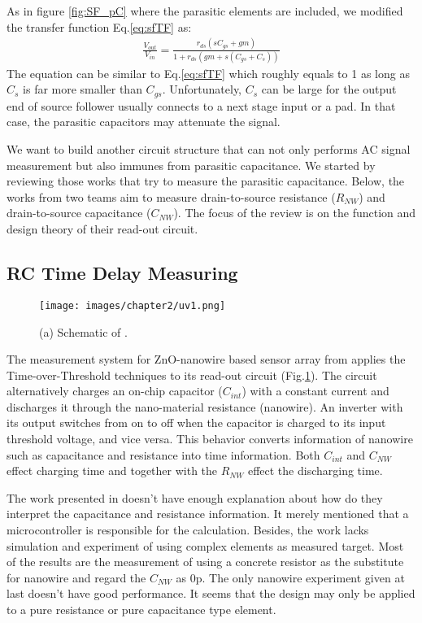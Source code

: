 As in figure \ref{fig:SF_pC} where the parasitic elements are included, we modified the transfer function Eq.\ref{eq:sfTF} as:
\begin{align}
    \frac{V_{out}}{V_{in}} = \frac{r_{ds}(sC_{gs} + gm)}{1 + r_{ds}(gm + s(C_{gs}+C_s))}
\end{align}
The equation can be similar to Eq.\ref{eq:sfTF} which roughly equals to 1 as long as $C_s$ is far more smaller than $C_{gs}$.
Unfortunately, $C_s$ can be large for the output end of source follower usually connects to a next stage input or a pad.
In that case, the parasitic capacitors may attenuate the signal.

We want to build another circuit structure that can not only performs AC signal measurement but also immunes from parasitic capacitance.
We started by reviewing those works that try to measure the parasitic capacitance.
Below, the works from two teams aim to measure drain-to-source resistance ($R_{NW}$) and drain-to-source capacitance ($C_{NW}$).
The focus of the review is on the function and design theory of their read-out circuit.


\subsection{RC Time Delay Measuring}
\begin{figure}[!htbp]
    \centering
    \texttt{[image: images/chapter2/uv1.png]}
    \caption{(a) Schematic of \cite{Juv1}.}
    \label{fig:tot1}
\end{figure}

The measurement system for ZnO-nanowire based sensor array from \cite{Juv1} applies the Time-over-Threshold techniques to its read-out circuit (Fig.\ref{fig:tot1}).
The circuit alternatively charges an on-chip capacitor ($C_{int}$) with a constant current and discharges it through the nano-material resistance (nanowire).
An inverter with its output switches from on to off when the capacitor is charged to its input threshold voltage, and vice versa.
This behavior converts information of nanowire such as capacitance and resistance into time information.
Both $C_{int}$ and $C_{NW}$ effect charging time and together with the $R_{NW}$ effect the discharging time.

The work presented in \cite{Juv1} doesn't have enough explanation about how do they interpret the capacitance and resistance information.
It merely mentioned that a microcontroller is responsible for the calculation.
Besides, the work lacks simulation and experiment of using complex elements as measured target.
Most of the results are the measurement of using a concrete resistor as the substitute for nanowire and regard the $C_{NW}$ as 0p.
The only nanowire experiment given at last doesn't have good performance.
It seems that the design may only be applied to a pure resistance or pure capacitance type element.


